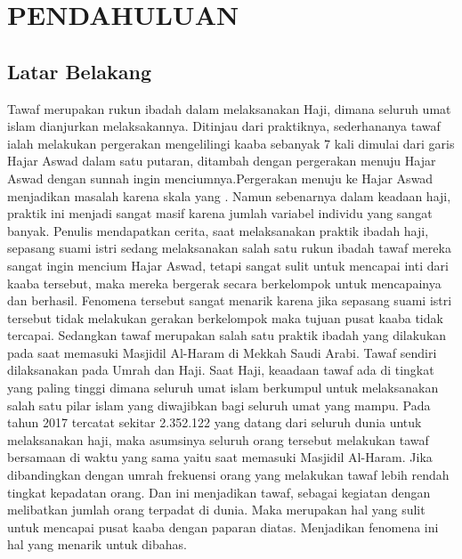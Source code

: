 %
\chapter{PENDAHULUAN}\label{cha:pendahuluan}
\section{Latar Belakang}\label{sec:latar}

\hspace{0.6cm} Tawaf merupakan rukun ibadah dalam melaksanakan Haji, dimana seluruh umat islam dianjurkan melaksakannya. Ditinjau dari praktiknya, sederhananya tawaf ialah melakukan pergerakan mengelilingi kaaba sebanyak 7 kali dimulai dari garis Hajar Aswad dalam satu putaran, ditambah dengan pergerakan menuju Hajar Aswad dengan sunnah ingin menciumnya.Pergerakan menuju ke Hajar Aswad menjadikan masalah karena skala yang . Namun sebenarnya dalam keadaan haji, praktik ini menjadi sangat masif karena jumlah variabel individu yang sangat banyak. Penulis mendapatkan cerita, saat melaksanakan praktik ibadah haji, sepasang suami istri sedang melaksanakan salah satu rukun ibadah tawaf mereka sangat ingin mencium Hajar Aswad, tetapi sangat sulit untuk mencapai inti dari kaaba tersebut, maka mereka bergerak secara berkelompok untuk mencapainya dan berhasil. Fenomena  tersebut sangat menarik karena jika sepasang suami istri tersebut tidak melakukan gerakan berkelompok maka tujuan pusat kaaba tidak tercapai. Sedangkan tawaf merupakan salah satu praktik ibadah yang dilakukan pada saat memasuki Masjidil Al-Haram di Mekkah Saudi Arabi. Tawaf sendiri dilaksanakan pada Umrah dan Haji. Saat Haji, keaadaan tawaf ada di tingkat yang paling tinggi dimana seluruh umat islam berkumpul untuk melaksanakan salah satu pilar islam yang diwajibkan bagi seluruh umat yang mampu. Pada tahun 2017 tercatat sekitar 2.352.122 yang datang dari seluruh dunia untuk melaksanakan haji\citep{Saudi2017}, maka asumsinya seluruh orang tersebut melakukan tawaf bersamaan di waktu yang sama yaitu saat memasuki Masjidil Al-Haram. Jika dibandingkan dengan umrah frekuensi orang yang melakukan tawaf lebih rendah tingkat kepadatan orang. Dan ini menjadikan tawaf, sebagai kegiatan dengan melibatkan jumlah orang terpadat di dunia. Maka merupakan hal yang sulit untuk mencapai pusat kaaba dengan paparan diatas. Menjadikan fenomena ini hal yang menarik untuk dibahas.

